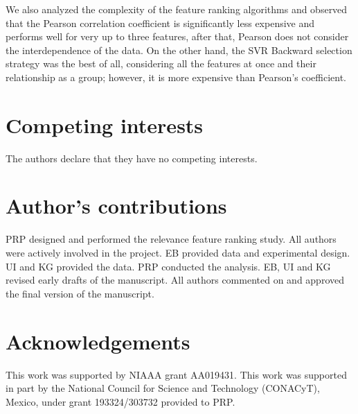 \documentclass{bmcart}
\begin{document}
We also analyzed the complexity of the feature ranking algorithms and observed
that the Pearson correlation coefficient is significantly less expensive and
performs well for very up to three features, after that, Pearson does not
consider the interdependence of the data. On the other hand, the SVR Backward
selection strategy was the best of all, considering all the features at once
and their relationship as a group; however, it is more expensive than Pearson's
coefficient.





\begin{backmatter}

\section*{Competing interests}
  The authors declare that they have no competing interests.

\section*{Author's contributions}
PRP designed and performed the relevance feature ranking study. All authors were
actively involved in the project. EB provided data and experimental design. UI and KG provided the data. PRP conducted the 
analysis. EB, UI and KG revised early drafts of the manuscript. All
authors commented on and approved the final version of the manuscript.

\section*{Acknowledgements}
This work was supported by NIAAA grant AA019431.
This work was supported in part by the National Council for Science and
Technology (CONACyT), Mexico, under grant 193324/303732 provided to PRP.



\end{backmatter}
\end{document}
